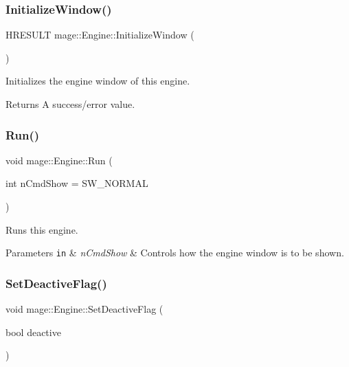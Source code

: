 \subsubsection{\texorpdfstring{Initialize\+Window()}{InitializeWindow()}}
{\footnotesize\ttfamily H\+R\+E\+S\+U\+LT mage\+::\+Engine\+::\+Initialize\+Window (\begin{DoxyParamCaption}{ }\end{DoxyParamCaption})\hspace{0.3cm}{\ttfamily [protected]}}

Initializes the engine window of this engine.

\begin{DoxyReturn}{Returns}
A success/error value. 
\end{DoxyReturn}
\hypertarget{classmage_1_1_engine_a246c82d0e55bc29e73aecbc365464ec8}{}\label{classmage_1_1_engine_a246c82d0e55bc29e73aecbc365464ec8} 
\subsubsection{\texorpdfstring{Run()}{Run()}}
{\footnotesize\ttfamily void mage\+::\+Engine\+::\+Run (\begin{DoxyParamCaption}\item[{int}]{n\+Cmd\+Show = {\ttfamily SW\+\_\+NORMAL} }\end{DoxyParamCaption})}

Runs this engine.


\begin{DoxyParams}[1]{Parameters}
\mbox{\tt in}  & {\em n\+Cmd\+Show} & Controls how the engine window is to be shown. \\
\hline
\end{DoxyParams}
\hypertarget{classmage_1_1_engine_a942bfa9892fa79bb1068d7c7ec4e6732}{}\label{classmage_1_1_engine_a942bfa9892fa79bb1068d7c7ec4e6732} 
\subsubsection{\texorpdfstring{Set\+Deactive\+Flag()}{SetDeactiveFlag()}}
{\footnotesize\ttfamily void mage\+::\+Engine\+::\+Set\+Deactive\+Flag (\begin{DoxyParamCaption}\item[{bool}]{deactive }\end{DoxyParamCaption})}

